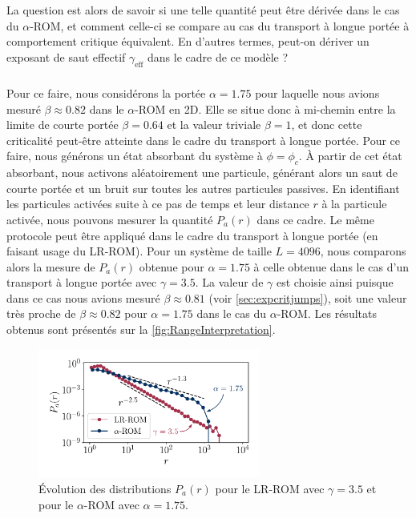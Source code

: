 \noindent La question est alors de savoir si une telle quantité peut être dérivée dans le cas du $\alpha$-ROM, et comment celle-ci se compare au cas du transport à longue portée à comportement critique équivalent. En d'autres termes, peut-on dériver un exposant de saut effectif $\gamma_\text{eff}$ dans le cadre de ce modèle ? 

\subparagraph{}Pour ce faire, nous considérons la portée $\alpha = 1.75$ pour laquelle nous avions mesuré $\beta\approx 0.82$ dans le $\alpha$-ROM en 2D. Elle se situe donc à mi-chemin entre la limite de courte portée $\beta = 0.64$ et la valeur triviale $\beta = 1$, et donc cette criticalité peut-être atteinte dans le cadre du transport à longue portée. Pour ce faire, nous générons un état absorbant du système à $\phi = \phi_c$. \`A partir de cet état absorbant, nous activons aléatoirement une particule, générant alors un saut de courte portée et un bruit sur toutes les autres particules passives. En identifiant les particules activées suite à ce pas de temps et leur distance $r$ à la particule activée, nous pouvons mesurer la quantité $P_a(r)$ dans ce cadre. Le même protocole peut être appliqué dans le cadre du transport à longue portée (en faisant usage du LR-ROM). Pour un système de taille $L=4096$, nous comparons alors la mesure de $P_a(r)$ obtenue pour $\alpha = 1.75$ à celle obtenue dans le cas d'un transport à longue portée avec $\gamma = 3.5$. La valeur de $\gamma$ est choisie ainsi puisque dans ce cas nous avions mesuré $\beta \approx 0.81$ (voir \autoref{sec:expcritjumps}), soit une valeur très proche de $\beta\approx 0.82$ pour $\alpha = 1.75$ dans le cas du $\alpha$-ROM. Les résultats obtenus sont présentés sur la \autoref{fig:RangeInterpretation}.

\begin{figure}[h]
	\centering
	\includegraphics[width=0.65\textwidth]{Chapitre3/Figures/Interpretation/RangeInterpretation.pdf}
	\caption{Évolution des distributions $P_a(r)$ pour le LR-ROM avec $\gamma = 3.5$ et pour le $\alpha$-ROM avec $\alpha = 1.75$.}
	\label{fig:RangeInterpretation}
\end{figure}


